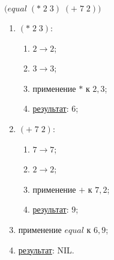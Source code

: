 \newpage
\problem $\bigl(equal\; (*\; 2\; 3)\; (+\; 7\; 2) \bigr)$

\begin{enumerate}
	\item $(*\; 2\; 3)$:
	\begin{enumerate}
		\item $2 \to 2$;
		\item $3 \to 3$;
		\item применение $*$ к $2, 3$;
		\item \underline{результат}: $6$;
	\end{enumerate}
	\item $(+\; 7\; 2)$:
	\begin{enumerate}
		\item $7 \to 7$;
		\item $2 \to 2$;
		\item применение $+$ к $7, 2$;
		\item \underline{результат}: $9$;
	\end{enumerate}
	\item применение $equal$ к $6, 9$;
	\item \underline{результат}: NIL.
\end{enumerate}